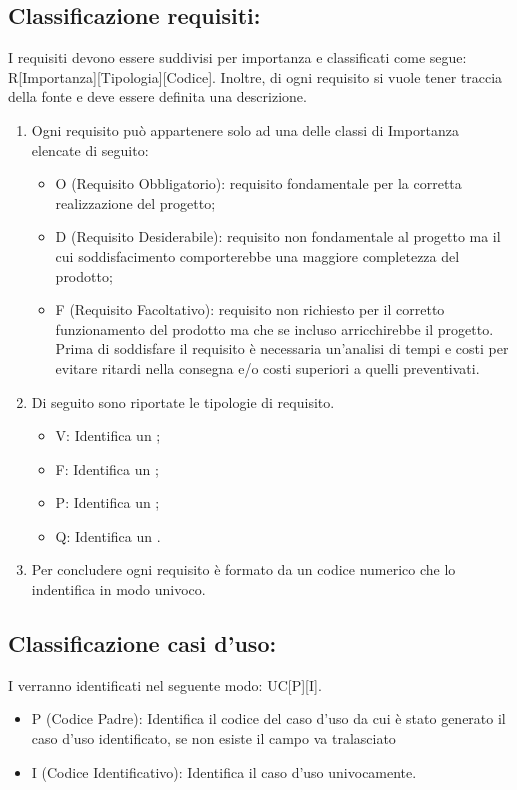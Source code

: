 \documentclass[./../NomeDocumento.tex]{subfiles}
\begin{document}
	\subsection{Classificazione requisiti:} I requisiti devono essere suddivisi per importanza e classificati come segue: R[Importanza][Tipologia][Codice]. Inoltre, di ogni requisito si vuole tener traccia della fonte e deve essere definita una descrizione.
		\begin{enumerate}
			\item Ogni requisito può appartenere solo ad una delle classi di Importanza elencate di seguito:
			\begin{itemize}
				\item O (Requisito Obbligatorio): requisito fondamentale per la corretta realizzazione del progetto;
				\item D (Requisito Desiderabile): requisito non fondamentale al progetto ma il cui soddisfacimento comporterebbe una maggiore completezza del prodotto;
				\item F (Requisito Facoltativo): requisito non richiesto per il corretto funzionamento del prodotto ma che se incluso arricchirebbe il progetto. Prima di soddisfare il requisito è necessaria un’analisi di tempi e costi per evitare ritardi nella consegna e/o costi superiori a quelli preventivati.
			\end{itemize}
			\item Di seguito sono riportate le tipologie di requisito.
			\begin{itemize}
				\item V: Identifica un ;
				\item F: Identifica un ;
				\item P: Identifica un ;
				\item Q: 
				Identifica un .
			\end{itemize}
		\item Per concludere ogni requisito è formato da un codice numerico che lo indentifica in modo univoco.

		\end{enumerate}
		
	\subsection{Classificazione casi d’uso:} 
	I  verranno identificati nel seguente modo: UC[P][I].
	\begin{itemize}
		\item P (Codice Padre): Identifica il codice del caso d'uso da cui è stato generato il caso d'uso identificato, se non esiste il campo va tralasciato
		\item I (Codice Identificativo): Identifica il caso d'uso univocamente.
		\end{itemize}
	
\end{document}
